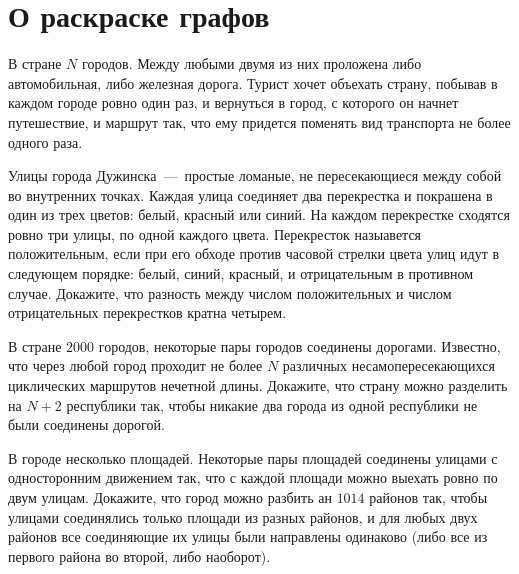 \newpage
\section{О раскраске графов}


\begin{exersize}
	В стране $N$ городов. Между любыми двумя из них проложена либо автомобильная, либо железная дорога. Турист хочет объехать страну, побывав в каждом городе ровно один раз, и вернуться в город, с которого он начнет путешествие, и маршрут так, что ему придется поменять вид транспорта не более одного раза.
\end{exersize}	 

\begin{exersize}
	Улицы города Дужинска~---~простые ломаные, не пересекающиеся между собой во внутренних точках. Каждая улица соединяет два перекрестка и покрашена в один из трех цветов: белый, красный или синий. На каждом перекрестке сходятся ровно три улицы, по одной каждого цвета. Перекресток назыавется положительным, если при его обходе против часовой стрелки цвета улиц идут в следующем порядке: белый, синий, красный, и отрицательным в противном случае. Докажите, что разность между числом положительных и числом отрицательных перекрестков кратна четырем.
\end{exersize}	 

\begin{exersize}
	В стране $2000$ городов, некоторые пары городов соединены дорогами. Известно, что через любой город проходит не более $N$ различных несамопересекающихся циклических маршрутов нечетной длины. Докажите, что страну можно разделить на $N+2$ республики так, чтобы никакие два города из одной республики не были соединены дорогой.
\end{exersize}	 


\begin{exersize}
	В городе несколько площадей. Некоторые пары площадей соединены улицами с односторонним движением так, что с каждой площади можно выехать ровно по двум улицам. Докажите, что город можно разбить ан $1014$ районов так, чтобы улицами соединялись только площади из разных районов, и для любых двух районов все соединяющие их улицы были направлены одинаково (либо все из первого района во второй, либо наоборот).
\end{exersize}

